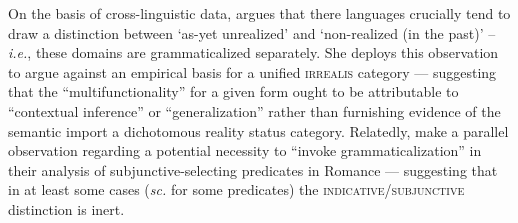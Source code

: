 On the basis of cross-linguistic data, \citet[138\textit{ff}]{Cristofaro2012} argues that there languages crucially tend to draw a distinction between `as-yet unrealized' and `non-realized (in the past)' -- \textit{i.e.}, these domains are grammaticalized separately. She deploys this observation to argue against an empirical basis for a unified \textsc{irrealis} category --- suggesting that the ``multifunctionality'' for a given form ought to be attributable to ``contextual inference'' or ``generalization'' rather than furnishing evidence of the semantic import a dichotomous reality status category. Relatedly, \citet[467]{Portner2012} make a parallel observation regarding a potential necessity to ``invoke  grammaticalization'' in their analysis of subjunctive-selecting predicates in Romance --- suggesting that in at least some cases (\textit{sc.} for some predicates) the \textsc{indicative/subjunctive}  distinction is inert.
	

